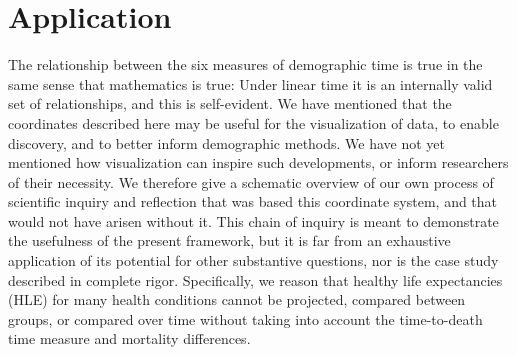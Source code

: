 \documentclass[12pt,oneside,a4paper]{article} %
\begin{document}
%
%

\FloatBarrier

\section*{Application}
The relationship between the six measures of demographic time is true in the
same sense that mathematics is true: Under linear time it is an internally valid
set of relationships, and this is self-evident. We have mentioned that the
coordinates described here may be useful for the visualization of data, to
enable discovery, and to better inform demographic methods. We have not yet
mentioned how visualization can inspire such developments, or inform researchers
of their necessity. We therefore give a schematic overview of our own process of
scientific inquiry and reflection that was based this coordinate system, and
that would not have arisen without it. This chain of inquiry is meant to demonstrate the
usefulness of the present framework, but it is far from an exhaustive
application of its potential for other substantive questions, nor is the case
study described in complete rigor. Specifically, we reason that healthy life
expectancies (HLE) for many health conditions cannot be projected, compared
between groups, or compared over time without taking into account the time-to-death time
measure and mortality differences.
\end{document}
